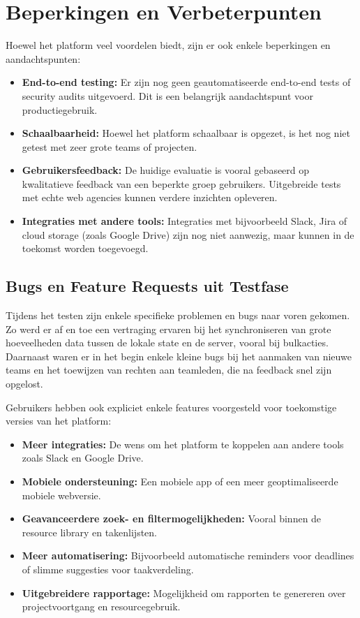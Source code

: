 \section{Beperkingen en Verbeterpunten}
\label{sec:beperkingen}

Hoewel het platform veel voordelen biedt, zijn er ook enkele beperkingen en aandachtspunten:
\begin{itemize}
    \item \textbf{End-to-end testing:} Er zijn nog geen geautomatiseerde end-to-end tests of security audits uitgevoerd. Dit is een belangrijk aandachtspunt voor productiegebruik.
    \item \textbf{Schaalbaarheid:} Hoewel het platform schaalbaar is opgezet, is het nog niet getest met zeer grote teams of projecten.
    \item \textbf{Gebruikersfeedback:} De huidige evaluatie is vooral gebaseerd op kwalitatieve feedback van een beperkte groep gebruikers. Uitgebreide tests met echte web agencies kunnen verdere inzichten opleveren.
    \item \textbf{Integraties met andere tools:} Integraties met bijvoorbeeld Slack, Jira of cloud storage (zoals Google Drive) zijn nog niet aanwezig, maar kunnen in de toekomst worden toegevoegd.

\end{itemize}

\subsection{Bugs en Feature Requests uit Testfase}
Tijdens het testen zijn enkele specifieke problemen en bugs naar voren gekomen. Zo werd er af en toe een vertraging ervaren bij het synchroniseren van grote hoeveelheden data tussen de lokale state en de server, vooral bij bulkacties. Daarnaast waren er in het begin enkele kleine bugs bij het aanmaken van nieuwe teams en het toewijzen van rechten aan teamleden, die na feedback snel zijn opgelost. 

Gebruikers hebben ook expliciet enkele features voorgesteld voor toekomstige versies van het platform:
\begin{itemize}
    \item \textbf{Meer integraties:} De wens om het platform te koppelen aan andere tools zoals Slack en Google Drive.
    \item \textbf{Mobiele ondersteuning:} Een mobiele app of een meer geoptimaliseerde mobiele webversie.
    \item \textbf{Geavanceerdere zoek- en filtermogelijkheden:} Vooral binnen de resource library en takenlijsten.
    \item \textbf{Meer automatisering:} Bijvoorbeeld automatische reminders voor deadlines of slimme suggesties voor taakverdeling.
    \item \textbf{Uitgebreidere rapportage:} Mogelijkheid om rapporten te genereren over projectvoortgang en resourcegebruik.
\end{itemize}

